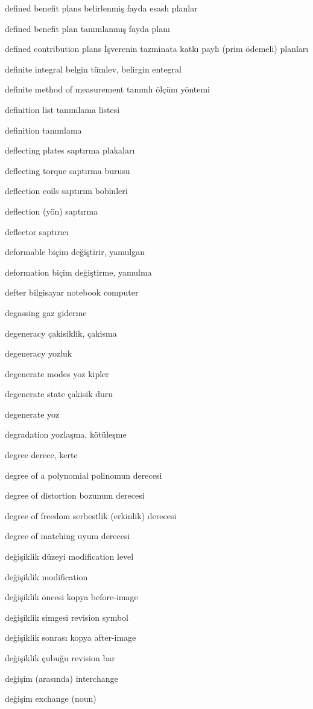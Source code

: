 \documentclass[12pt,fleqn]{article}\usepackage{../../common}
\begin{document}
defined benefit plans belirlenmiş fayda esaslı planlar

defined benefit plan tanımlanmış fayda planı

defined contribution plans İşverenin tazminata katkı paylı (prim ödemeli) planları

definite integral belgin tümlev, belirgin entegral

definite method of measurement tanımlı ölçüm yöntemi

definition list tanımlama listesi

definition tanımlama

deflecting plates saptırma plakaları

deflecting torque saptırma burusu

deflection coils saptırım bobinleri

deflection (yön) saptırma

deflector saptırıcı

deformable biçim değiştirir, yamulgan

deformation biçim değiştirme, yamulma

defter bilgisayar notebook computer

degassing gaz giderme

degeneracy çakisiklik, çakisma

degeneracy yozluk

degenerate modes yoz kipler

degenerate state çakisik duru

degenerate yoz

degradation yozlaşma, kötüleşme

degree derece, kerte

degree of a polynomial polinomun derecesi

degree of distortion bozunum derecesi

degree of freedom serbestlik (erkinlik) derecesi

degree of matching uyum derecesi

değişiklik düzeyi modification level

değişiklik modification

değişiklik öncesi kopya before-image

değişiklik simgesi revision symbol

değişiklik sonrası kopya after-image

değişiklik çubuğu revision bar

değişim (arasında) interchange

değişim exchange (noun)
\end{document}
